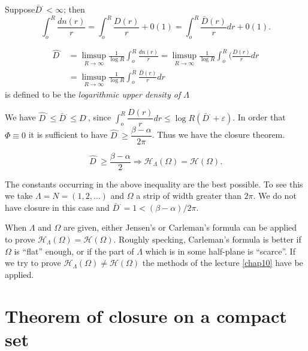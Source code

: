 Suppose\pageoriginale $\bar{D}^. < \infty$; then
$$
\int^R_o \frac{dn(r)}{r} = \int^R_o \frac{D(r)}{r} + 0(1)= \int^R_o
\frac{\bar{D}(r)}{r} dr + 0(1). 
$$

\begin{defi*}%
 \begin{align*}
   \hat{D}^. & = \limsup_{R \rightarrow \infty} \frac{1}{\log R}
   \int^R_o \frac{dn(r)}{r} = \limsup_{R \rightarrow \infty}
   \frac{1}{\log R} \int^R_o (\frac{D(r)}{r} dr \\ 
   & = \limsup_{R \rightarrow \infty} \frac{1}{\log R} \int^R_o
   \frac{\bar{D}(r)}{r} dr 
 \end{align*}
 is defined to be the {\em logarithmic upper density of $\Lambda$}
\end{defi*}

We have $\hat{D}^. \le \bar{D}^. \le D^.$, since $\int^R_o
\dfrac{{D}(r)}{r} dr \le \log R(\bar{D}^. + \varepsilon)$. In order that
$\Phi \equiv 0$ it is sufficient to have $\hat{D}^. \ge \dfrac{\beta -
 \alpha}{2 \pi}$. Thus we have the closure theorem. 

\begin{theorem*}%
  $$
  \hat{D}^. \ge \frac{\beta - \alpha}{2} \Rightarrow \mathscr{H}_\Lambda
  (\Omega) = \mathscr{H}(\Omega). 
  $$
\end{theorem*}

The constants occurring in the above inequality are the best
possible. To see this we take $\Lambda = N = (1, 2, \ldots)$ and
$\Omega$ a strip of width greater than $2 \pi$. We do not have closure
in this case and $\bar{D}^.= 1 < (\beta - \alpha) /2 \pi$. 

When $\Lambda$ and $\Omega$ are given, either Jensen's or Carleman's
formula can be applied to prove $\mathscr{H}_{\Lambda} (\Omega) =
\mathscr{H}(\Omega)$. Roughly specking, Carleman's formula is better
if $\Omega$ is ``flat'' enough, or if the part of $\Lambda$ which is in
some half-plane is ``scarce''. If we try to prove
$\mathscr{H}_{\Lambda}(\Omega) \neq \mathscr{H}(\Omega)$ the methods of
the lecture \ref{chap10} have be applied. 

\section{Theorem of closure on a compact set}\label{chap11:sec3}%

